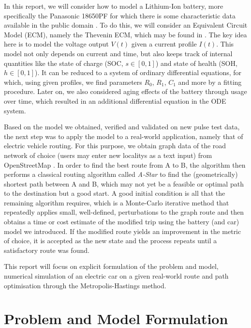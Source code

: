 \documentclass{prettytex/ox/mmsc-special-topic}
\begin{document}
  In this report, we will consider how to model a Lithium-Ion battery, more specifically the Panasonic 18650PF for which there is some characteristic data available in the public domain \parencite{panasonicnums}.
  To do this, we will consider an Equivalent Circuit Model (ECM), namely the Thevenin ECM, which may be found in .
  The key idea here is to model the voltage output $V(t)$ given a current profile $I(t)$.
  This model not only depends on current and time, but also keeps track of internal quantities like the state of charge (SOC, $s \in [0, 1]$) and state of health (SOH, $h \in [0, 1]$).
  It can be reduced to a system of ordinary differential equations, for which, using given profiles, we find parameters $R_0$, $R_1$, $C_1$ and more by a fitting procedure.
  Later on, we also considered aging effects of the battery through usage over time, which resulted in an additional differential equation in the ODE system.

  Based on the model we obtained, verified and validated on new pulse test data, the next step was to apply the model to a real-world application, namely that of electric vehicle routing.
  For this purpose, we obtain graph data of the road network of choice (users may enter new localitys as a text input) from OpenStreetMap \parencite{osm}.
  In order to find the best route from A to B, the algorithm then performs a classical routing algorithm called \emph{A-Star} to find the (geometrically) shortest path between A and B, which may not yet be a feasible or optimal path to the destination but a good start.
  A good initial condition is all that the remaining algorithm requires, which is a Monte-Carlo iterative method that repeatedly applies small, well-defined, perturbations to the graph route and then obtains a time or cost estimate of the modified trip using the battery (and car) model we introduced.
  If the modified route yields an improvement in the metric of choice, it is accepted as the new state and the process repeats until a satisfactory route was found.

  This report will focus on explicit formulation of the problem and model, numerical simulation of an electric car on a given real-world route and path optimisation through the Metropolis-Hastings method.

  \section{Problem and Model Formulation}
\end{document}
